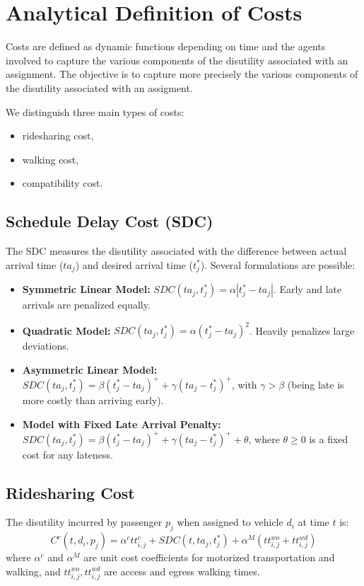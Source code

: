 \documentclass[11pt,a4paper]{article}
\begin{document}
\section{Analytical Definition of Costs}
Costs are defined as dynamic functions depending on time and the agents involved to capture the various components of the disutility associated with an assignment. The objective is to capture more precisely the various components of the disutility associated with an assigment.

We distinguish three main types of costs:
\begin{itemize}
		\item ridesharing cost,
		\item walking cost,
		\item compatibility cost.
\end{itemize}

\subsection{Schedule Delay Cost (SDC)}
The SDC measures the disutility associated with the difference between actual arrival time ($ta_j$) and desired arrival time ($t^*_j$). Several formulations are possible:
\begin{itemize}
    \item \textbf{Symmetric Linear Model:} $SDC(ta_j, t^*_j) = \alpha |t^*_j - ta_j|$. Early and late arrivals are penalized equally.
    \item \textbf{Quadratic Model:} $SDC(ta_j, t^*_j) = \alpha (t^*_j - ta_j)^2$. Heavily penalizes large deviations.
    \item \textbf{Asymmetric Linear Model:} $SDC(ta_j, t^*_j) = \beta (t^*_j - ta_j)^+ + \gamma (ta_j - t^*_j)^+$, with $\gamma > \beta$ (being late is more costly than arriving early).
    \item \textbf{Model with Fixed Late Arrival Penalty:} $SDC(ta_j, t^*_j) = \beta (t^*_j - ta_j)^+ + \gamma (ta_j - t^*_j)^+ + \theta$, where $\theta \geq 0$ is a fixed cost for any lateness.
\end{itemize}

\subsection{Ridesharing Cost}
The disutility incurred by passenger $p_j$ when assigned to vehicle $d_i$ at time $t$ is:
\[ C^c(t, d_i, p_j) = \alpha^c tt^c_{i,j} + SDC(t, ta_j, t^*_j) + \alpha^M (tt^{wo}_{i,j} + tt^{wd}_{i,j}) \]
where $\alpha^c$ and $\alpha^M$ are unit cost coefficients for motorized transportation and walking, and $tt^{wo}_{i,j}, tt^{wd}_{i,j}$ are access and egress walking times.
\end{document}
